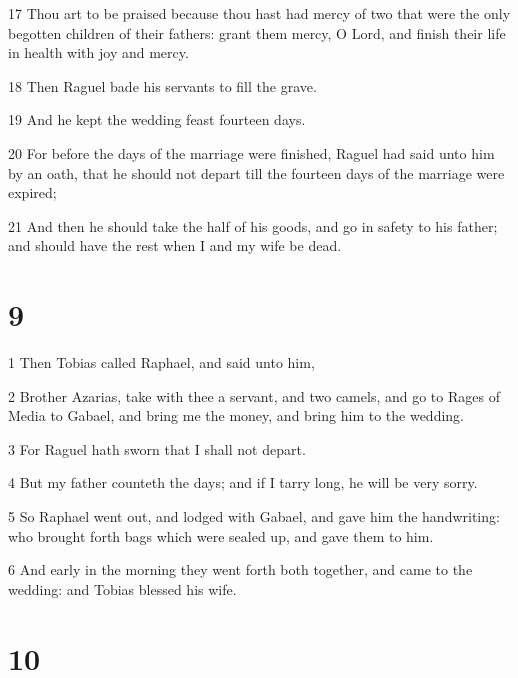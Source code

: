 \par 17 Thou art to be praised because thou hast had mercy of two that were the only begotten children of their fathers: grant them mercy, O Lord, and finish their life in health with joy and mercy.
\par 18 Then Raguel bade his servants to fill the grave.
\par 19 And he kept the wedding feast fourteen days.
\par 20 For before the days of the marriage were finished, Raguel had said unto him by an oath, that he should not depart till the fourteen days of the marriage were expired;
\par 21 And then he should take the half of his goods, and go in safety to his father; and should have the rest when I and my wife be dead.

\chapter{9}

\par 1 Then Tobias called Raphael, and said unto him,
\par 2 Brother Azarias, take with thee a servant, and two camels, and go to Rages of Media to Gabael, and bring me the money, and bring him to the wedding.
\par 3 For Raguel hath sworn that I shall not depart.
\par 4 But my father counteth the days; and if I tarry long, he will be very sorry.
\par 5 So Raphael went out, and lodged with Gabael, and gave him the handwriting: who brought forth bags which were sealed up, and gave them to him.
\par 6 And early in the morning they went forth both together, and came to the wedding: and Tobias blessed his wife.

\chapter{10}

